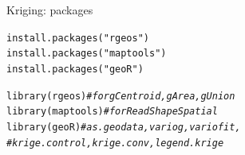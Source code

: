 \documentclass[xcolor=table,           xcolor=dvipsnames]{beamer}\usepackage[]{graphicx}\usepackage[]{color}
\makeatletter
\newcommand{\hlstr}[1]{\textcolor[rgb]{0.545,0.137,0.137}{#1}}
\newcommand{\hlcom}[1]{\textcolor[rgb]{0,0.392,0}{\textit{#1}}}
\newcommand{\hlstd}[1]{\textcolor[rgb]{0,0,0}{#1}}
\newcommand{\hlkwd}[1]{\textcolor[rgb]{0,0,1}{#1}}
\newenvironment{kframe}{%
 \def\at@end@of@kframe{}%
 \ifinner\ifhmode%
  \def\at@end@of@kframe{\end{minipage}}%
  \begin{minipage}{\columnwidth}%
 \fi\fi%
 \def\FrameCommand##1{\hskip\@totalleftmargin \hskip-\fboxsep
 \colorbox{shadecolor}{##1}\hskip-\fboxsep
     \hskip-\linewidth \hskip-\@totalleftmargin \hskip\columnwidth}%
 \MakeFramed {\advance\hsize-\width
   \@totalleftmargin\z@ \linewidth\hsize
   \@setminipage}}%
 {\par\unskip\endMakeFramed%
 \at@end@of@kframe}
\newenvironment{knitrout}{}{} %
\makeatother
\begin{document}

\begin{frame}[fragile]{Kriging: packages}
\begin{knitrout}
\color{fgcolor}\begin{kframe}
\begin{alltt}
\hlkwd{install.packages}\hlstd{(}\hlstr{"rgeos"}\hlstd{)}
\hlkwd{install.packages}\hlstd{(}\hlstr{"maptools"}\hlstd{)}
\hlkwd{install.packages}\hlstd{(}\hlstr{"geoR"}\hlstd{)}
\end{alltt}
\end{kframe}
\end{knitrout}
\begin{knitrout}
\color{fgcolor}\begin{kframe}
\begin{alltt}
\hlkwd{library}\hlstd{(rgeos)}    \hlcom{# for gCentroid, gArea, gUnion}
\hlkwd{library}\hlstd{(maptools)} \hlcom{# for ReadShapeSpatial}
\hlkwd{library}\hlstd{(geoR)}     \hlcom{# as.geodata, variog, variofit,}
\hlcom{# krige.control, krige.conv, legend.krige}
\end{alltt}
\end{kframe}
\end{knitrout}

\end{frame}

\end{document}
